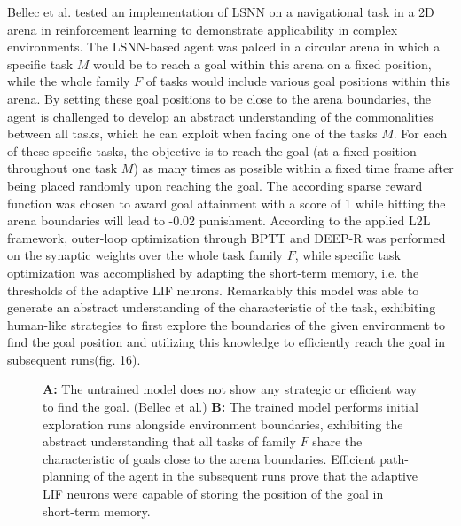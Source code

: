 \documentclass[letterpaper, 10 pt, conference]{ieeeconf}  %
\begin{document}
Bellec et al.\cite{bellecLongShorttermMemory2018} tested an implementation of LSNN on a navigational task in a 
2D arena in reinforcement learning to demonstrate applicability in 
complex environments. The LSNN-based agent was palced in a circular arena in which a specific task $M$ would be to reach a goal within this arena
on a fixed position, while the whole family $F$ of tasks would include various goal positions within this arena. By setting these goal positions 
to be close to the arena boundaries, the agent is challenged to develop an abstract understanding of the commonalities between all tasks, 
which he can exploit when facing one of the tasks $M$. For each of these specific tasks, the objective is 
to reach the goal (at a fixed position throughout one task $M$) as many times as possible within a fixed time frame after being placed randomly
upon reaching the goal. The according sparse reward function was chosen to award goal attainment with a score of 1 while hitting the arena
boundaries will lead to -0.02 punishment. According to the applied L2L framework, outer-loop optimization through BPTT and DEEP-R was performed on the
synaptic weights over the whole task family $F$, while specific task optimization was accomplished by 
adapting the short-term memory, i.e. the thresholds of the adaptive LIF neurons. Remarkably this model was able to generate an abstract understanding
of the characteristic of the task, exhibiting human-like strategies to first explore the boundaries of the given environment to find the goal 
position and utilizing this knowledge to efficiently reach the goal in subsequent runs(fig. 16). 
\begin{figure}[thpb]
        \centering
\caption{\textbf{A:} The untrained model does not show any strategic or efficient way to find the goal. (Bellec et al.) \newline
\textbf{B:} The trained model performs initial exploration runs alongside environment boundaries, exhibiting the abstract understanding
that all tasks of family $F$ share the characteristic of goals close to the arena boundaries. Efficient path-planning of the agent 
in the subsequent runs prove that the adaptive LIF neurons were capable of storing the position of the goal in short-term memory. 
\cite{bellecLongShorttermMemory2018}}
        \label{figurelabel}
        \end{figure}
        
\end{document}
